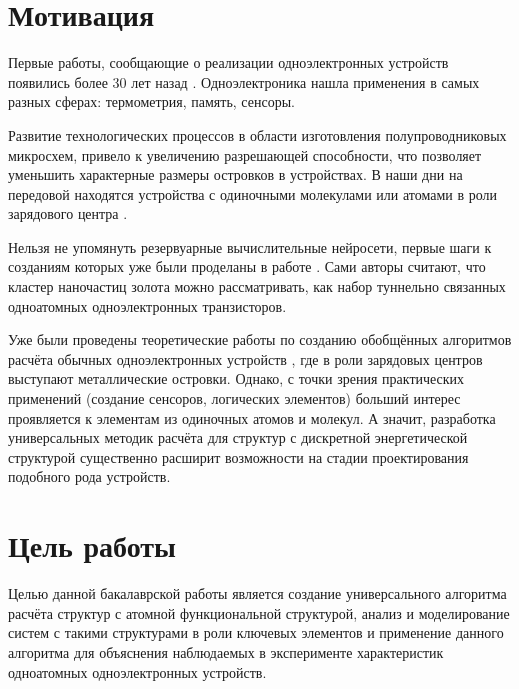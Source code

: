 \documentclass[12pt,a4paper]{report}
\begin{document}
\setcounter{page}{2}
\tableofcontents

\section*{Мотивация}

Первые работы, сообщающие о реализации одноэлектронных устройств появились более 30 лет назад \cite{Likharev}. Одноэлектроника нашла применения в самых разных сферах:  термометрия\cite{Thermo}, память\cite{memory}, сенсоры\cite{sensor}.

Развитие технологических процессов в области изготовления полупроводниковых микросхем, привело к увеличению разрешающей способности, что позволяет уменьшить характерные размеры островков в устройствах. В наши дни на передовой находятся устройства с одиночными молекулами или атомами в роли зарядового центра \cite{SASET_EXP_OUR, SMSET, SASET_TOP}. 

Нельзя не упомянуть резервуарные вычислительные нейросети, первые шаги к созданиям которых уже были проделаны в работе \cite{neuro}. Сами авторы считают, что кластер наночастиц золота можно рассматривать, как набор туннельно связанных одноатомных одноэлектронных транзисторов. 

Уже были проведены теоретические работы по созданию обобщённых алгоритмов расчёта обычных одноэлектронных устройств \cite{Dobr}, где в роли зарядовых центров выступают металлические островки. Однако, с точки зрения практических применений (создание сенсоров, логических элементов) больший интерес проявляется к элементам из одиночных атомов и молекул. А значит, разработка универсальных методик расчёта для структур с дискретной энергетической структурой существенно расширит возможности на стадии проектирования подобного рода устройств.

\section*{Цель работы}

Целью данной бакалаврской работы является создание универсального алгоритма расчёта структур с атомной функциональной структурой, анализ и моделирование систем с такими структурами в роли ключевых элементов и применение данного алгоритма для объяснения наблюдаемых в эксперименте характеристик одноатомных одноэлектронных устройств.
\end{document}
